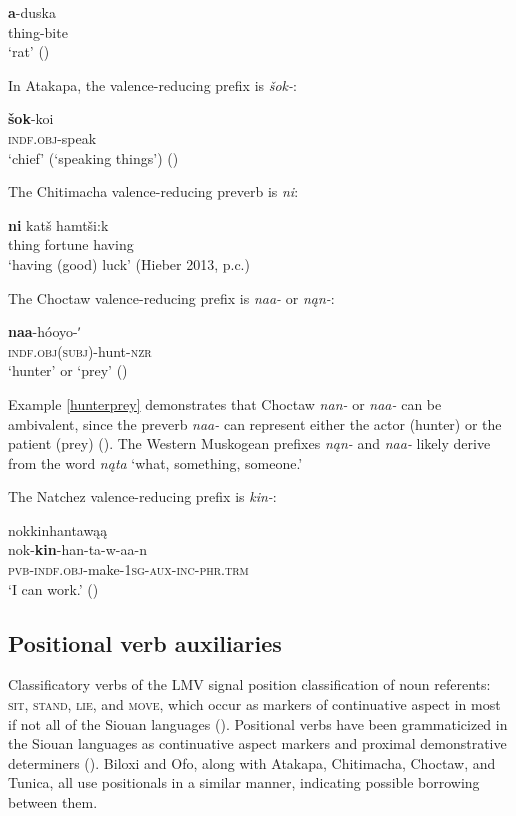 \documentclass[output=paper]{LSP/langsci}
\begin{document}
\ea
\gll	\textbf{a}-duska\\
		thing-bite\\
\glt	 `rat' (\citealt[186]{DorseySwanton1912})
\z

	In Atakapa, the valence-reducing prefix is \emph{šok-}:

\ea
\gll	\textbf{šok}-koi\\
		\textsc{indf.obj}-speak \\

\glt	`chief' (`speaking things') (\citealt[9]{GatschetSwanton1932})
\z

The Chitimacha valence-reducing preverb is \emph{ni}:

\ea
\gll	\textbf{ni} 	katš hamtši:k \\
	thing fortune having\\

\glt `having (good) luck' (Hieber 2013, p.c.)
\z

	The Choctaw valence-reducing prefix is \emph{naa-} or \emph{nąn-}:
	
\ea\label{hunterprey}
\gll	\textbf{naa}-hóoyo-ʹ~\\
		\textsc{indf.obj(subj)}-hunt-\textsc{nzr}\\
\glt	`hunter' or `prey' (\citealt[53]{Broadwell2006})
\z

Example \ref{hunterprey} demonstrates that Choctaw \emph{nan-} or \emph{naa-} can be ambivalent, since the preverb \emph{naa-} can represent either the actor (hunter) or the patient (prey) (\citealt[53]{Broadwell2006}). The Western Muskogean prefixes \emph{nąn-} and \emph{naa-} likely derive from the word \emph{nąta} `what, something, someone.'
 
	The Natchez valence-reducing prefix is \emph{kin-}:
	
\ea	nokkinhantawąą\\
\gll		nok-\textbf{kin}-han-ta-w-aa-n\\
		\textsc{pvb-indf.obj}-make-\textsc{1sg-aux-inc-phr.trm}\\
\glt	`I can work.' (\citealt[405]{Kimball2005})
\z

\subsection{Positional verb auxiliaries}

Classificatory verbs of the LMV signal position classification of noun referents: \textsc{sit}, \textsc{stand}, \textsc{lie}, and \textsc{move}, which occur as markers of continuative aspect in most if not all of the Siouan languages (\citealt[203]{Rankin2004}). Positional verbs have been grammaticized in the Siouan languages as continuative aspect markers and proximal demonstrative determiners (\citealt[116]{Mithun1999}). Biloxi and Ofo, along with Atakapa, Chitimacha, Choctaw, and Tunica, all use positionals in a similar manner, indicating possible borrowing between them. 
\end{document}

